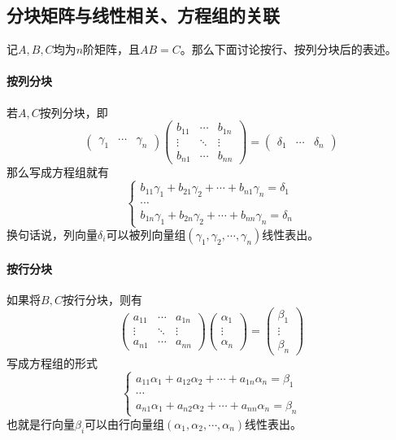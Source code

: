\subsection{分块矩阵与线性相关、方程组的关联}
记$A,B,C$均为$n$阶矩阵，且$AB=C$。那么下面讨论按行、按列分块后的表述。
\paragraph{按列分块} 若$A,C$按列分块，即
\[
    \begin{pmatrix}
        \gamma_1 & \cdots & \gamma_n
    \end{pmatrix}
    \begin{pmatrix}
        b_{11} & \cdots & b_{1n} \\
        \vdots & \ddots & \vdots \\
        b_{n1} & \cdots & b_{nn}
    \end{pmatrix}
    =
    \begin{pmatrix}
        \delta_1 & \cdots & \delta_n
    \end{pmatrix}
\]
那么写成方程组就有
\[
    \begin{cases}
        b_{11}\gamma_1 + b_{21}\gamma_2 + \cdots + b_{n1}\gamma_n = \delta_1 \\
        \cdots                                                               \\
        b_{1n}\gamma_1 + b_{2n}\gamma_2 + \cdots + b_{nn}\gamma_n = \delta_n
    \end{cases}
\]
换句话说，列向量$\delta_i$可以被列向量组$(\gamma_1,\gamma_2,\cdots,\gamma_n)$线性表出。

\paragraph{按行分块}如果将$B,C$按行分块，则有
\[
    \begin{pmatrix}
        a_{11} & \cdots & a_{1n} \\
        \vdots & \ddots & \vdots \\
        a_{n1} & \cdots & a_{nn}
    \end{pmatrix}
    \begin{pmatrix}
        \alpha_1 \\ \vdots \\ \alpha_n
    \end{pmatrix}
    =
    \begin{pmatrix}
        \beta_1 \\ \vdots \\ \beta_n
    \end{pmatrix}
\]
写成方程组的形式
\[
    \begin{cases}
        a_{11}\alpha_1 + a_{12}\alpha_2 + \cdots + a_{1n}\alpha_n = \beta_1 \\
        \cdots                                                              \\
        a_{n1}\alpha_1 + a_{n2}\alpha_2 + \cdots + a_{nn}\alpha_n = \beta_n
    \end{cases}
\]
也就是行向量$\beta_i$可以由行向量组$(\alpha_1,\alpha_2,\cdots,\alpha_n)$线性表出。

